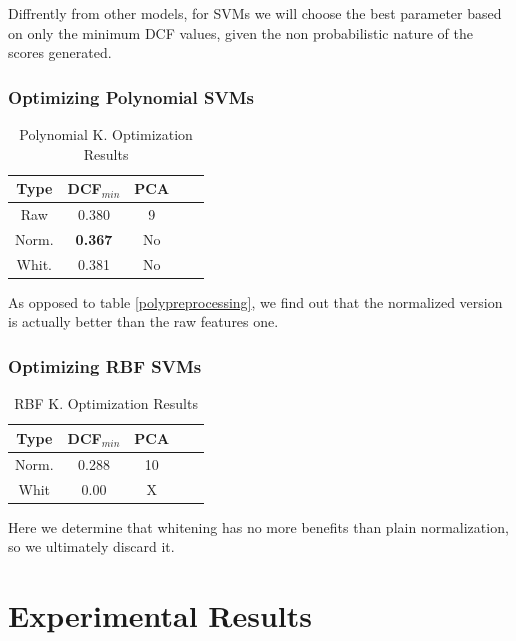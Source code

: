 \documentclass[12pt, twocolumn]{article}
\begin{document}
Diffrently from other models, for SVMs we will choose the best parameter based on only the minimum DCF values,
given the non probabilistic nature of the scores generated.

\subsubsection{Optimizing Polynomial SVMs}

\begin{table}[H] 
    \centering
    \begin{tabular}{||c|c|c|c|c||}
        \hline
        Type & DCF$_{min}$ & PCA \\
        \hline
        \hline
        Raw   & 0.380 & 9 \\
        Norm. & {\bf 0.367} & No \\
        Whit. & 0.381 & No \\
        \hline
    \end{tabular}
    \caption{Polynomial K. Optimization Results}
    \label{tab:polyoptimization}
\end{table}

As opposed to table \ref{polypreprocessing}, we find out that the normalized version is actually better than the raw features one.

\subsubsection{Optimizing RBF SVMs}

\begin{table}[H] 
    \centering
    \begin{tabular}{||c|c|c|c|c||}
        \hline
        Type & DCF$_{min}$ & PCA \\
        \hline
        \hline
        Norm. & 0.288 & 10 \\
        Whit & 0.00 & X \\
        \hline
    \end{tabular}
    \caption{RBF K. Optimization Results}
    \label{tab:rbfoptimization}
\end{table}

Here we determine that whitening has no more benefits than plain normalization, so we ultimately discard it.

\section{Experimental Results}
\end{document}
